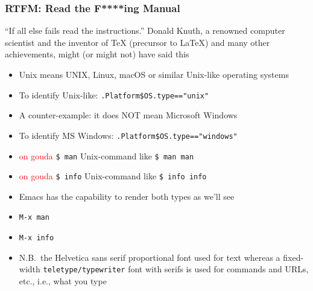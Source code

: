 \documentclass[11pt,pdftex,dvipsnames,usenames,helvetica]{beamer}
\newcommand*{\red}[1]{\textcolor{red}{#1}}
\begin{document}
\begin{frame}
\frametitle{RTFM: Read the F****ing Manual}

``If all else fails read the instructions.''
 Donald Knuth, a renowned computer scientist and 
the inventor of TeX (precursor to LaTeX) and many 
other achievements, might (or might not) have said this

\begin{itemize}
\item Unix means UNIX, Linux, macOS or similar Unix-like operating systems
\item To identify Unix-like: {\tt .Platform\$OS.type=="unix"}
\item A counter-example: it does NOT mean Microsoft Windows
\item To identify MS Windows: {\tt .Platform\$OS.type=="windows"}
\item  \red{on gouda} {\tt \$ man} Unix-command like {\tt \$ man man}
\item  \red{on gouda} {\tt \$ info} Unix-command like {\tt \$ info info}
\item Emacs has the capability to render both types as we'll see
\item {\tt M-x man}
\item {\tt M-x info}
\item N.B.\ the Helvetica sans serif proportional font used for text
  whereas a fixed-width {\tt teletype/typewriter} font with
  serifs is used for commands and URLs, etc., i.e., what you type
\end{itemize}

\end{frame}
\end{document}
